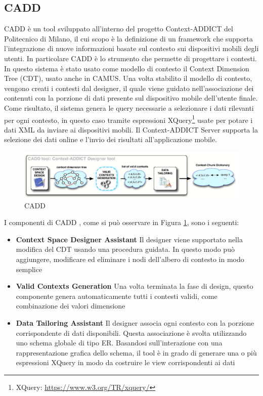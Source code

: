 \subsection*{CADD}

CADD è un tool sviluppato all'interno del progetto Context-ADDICT del Politecnico di Milano, il cui scopo è la definizione di un framework che supporta l'integrazione di nuove informazioni basate sul contesto sui dispositivi mobili degli utenti. In particolare CADD è lo strumento che permette di progettare i contesti. In questo sistema è stato usato come modello di contesto il Context Dimension Tree (CDT), usato anche in CAMUS.  Una volta stabilito il modello di contesto, vengono creati i contesti dal designer, il quale viene guidato nell'associazione dei contenuti con la porzione di dati presente sul dispositivo mobile dell'utente finale. Come risultato, il sistema genera le query necessarie a selezionare i dati rilevanti per ogni contesto, in questo caso tramite espressioni XQuery\footnote{XQuery: \url{https://www.w3.org/TR/xquery/}} usate per potare i dati XML da inviare ai dispositivi mobili.
Il Context-ADDICT Server supporta la selezione dei dati online e l'invio dei risultati all'applicazione mobile. 

\begin{figure}[ht]
	\centering
	\includegraphics[width=\textwidth]{2-nozioni-preliminari/Immagini/cadd.png}
	\caption{CADD}\label{fig:cadd}
\end{figure}
I componenti di CADD , come si può osservare in Figura  \ref{fig:cadd}, sono i seguenti:  
\begin{itemize}
	\item \textbf{Context Space Designer Assistant} Il designer viene supportato nella modifica del CDT usando una procedura guidata. In questo modo può aggiungere, modificare ed eliminare i nodi dell'albero di contesto in modo semplice
	\item \textbf{Valid Contexts Generation}
	Una volta terminata la fase di design, questo componente genera automaticamente tutti i contesti validi, come combinazione dei valori dimensione
	\item \textbf{Data Tailoring Assistant}
	Il designer associa ogni contesto con la porzione corrispondente di dati disponibili. Questa associazione è svolta utilizzando uno schema globale di tipo ER. Basandosi sull'interazione con una rappresentazione grafica dello schema, il tool è in grado di generare una o più espressioni XQuery in modo da costruire le view corrispondenti ai dati
\end{itemize}

